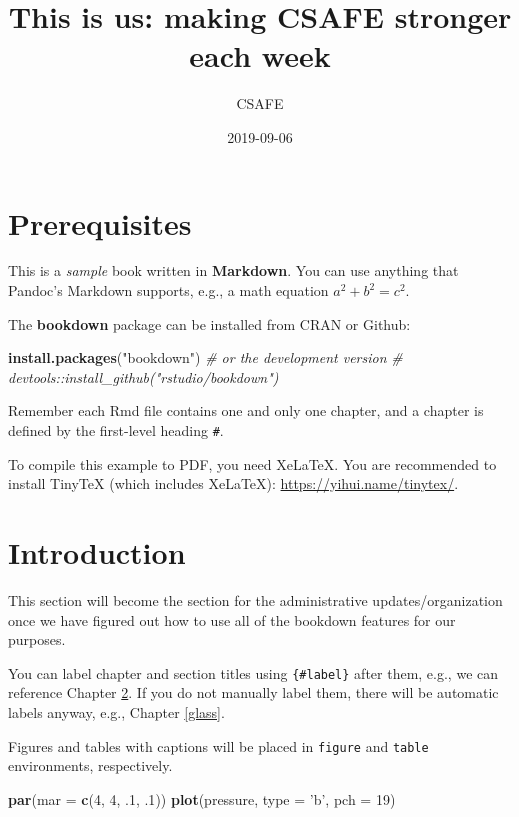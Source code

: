 \documentclass[]{book}
\title{This is us: making CSAFE stronger each week}
\author{CSAFE}
\date{2019-09-06}
\newenvironment{Shaded}{\begin{snugshade}}{\end{snugshade}}
\newcommand{\CommentTok}[1]{\textcolor[rgb]{0.56,0.35,0.01}{\textit{#1}}}
\newcommand{\DataTypeTok}[1]{\textcolor[rgb]{0.13,0.29,0.53}{#1}}
\newcommand{\DecValTok}[1]{\textcolor[rgb]{0.00,0.00,0.81}{#1}}
\newcommand{\FloatTok}[1]{\textcolor[rgb]{0.00,0.00,0.81}{#1}}
\newcommand{\KeywordTok}[1]{\textcolor[rgb]{0.13,0.29,0.53}{\textbf{#1}}}
\newcommand{\NormalTok}[1]{#1}
\newcommand{\StringTok}[1]{\textcolor[rgb]{0.31,0.60,0.02}{#1}}
\begin{document}
\maketitle

{
\setcounter{tocdepth}{1}
\tableofcontents
}
\hypertarget{prerequisites}{%
\chapter{Prerequisites}\label{prerequisites}}

This is a \emph{sample} book written in \textbf{Markdown}. You can use anything that Pandoc's Markdown supports, e.g., a math equation \(a^2 + b^2 = c^2\).

The \textbf{bookdown} package can be installed from CRAN or Github:

\begin{Shaded}
\begin{Highlighting}[]
\KeywordTok{install.packages}\NormalTok{(}\StringTok{"bookdown"}\NormalTok{)}
\CommentTok{# or the development version}
\CommentTok{# devtools::install_github("rstudio/bookdown")}
\end{Highlighting}
\end{Shaded}

Remember each Rmd file contains one and only one chapter, and a chapter is defined by the first-level heading \texttt{\#}.

To compile this example to PDF, you need XeLaTeX. You are recommended to install TinyTeX (which includes XeLaTeX): \url{https://yihui.name/tinytex/}.

\hypertarget{intro}{%
\chapter{Introduction}\label{intro}}

This section will become the section for the administrative updates/organization once we have figured out how to use all of the bookdown features for our purposes.

You can label chapter and section titles using \texttt{\{\#label\}} after them, e.g., we can reference Chapter \ref{intro}. If you do not manually label them, there will be automatic labels anyway, e.g., Chapter \ref{glass}.

Figures and tables with captions will be placed in \texttt{figure} and \texttt{table} environments, respectively.

\begin{Shaded}
\begin{Highlighting}[]
\KeywordTok{par}\NormalTok{(}\DataTypeTok{mar =} \KeywordTok{c}\NormalTok{(}\DecValTok{4}\NormalTok{, }\DecValTok{4}\NormalTok{, }\FloatTok{.1}\NormalTok{, }\FloatTok{.1}\NormalTok{))}
\KeywordTok{plot}\NormalTok{(pressure, }\DataTypeTok{type =} \StringTok{'b'}\NormalTok{, }\DataTypeTok{pch =} \DecValTok{19}\NormalTok{)}
\end{Highlighting}
\end{Shaded}
\end{document}
